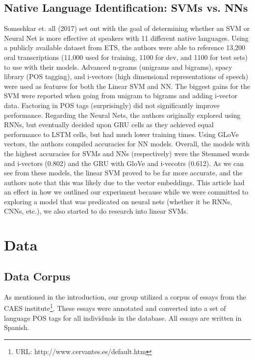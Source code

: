 \documentclass[12pt]{article}
\newcommand\tab[1][1cm]{\hspace*{#1}}
\begin{document}
 \subsection{Native Language Identification: SVMs vs. NNs}
 \tab Somsehkar et. all (2017) set out with the goal of determining whether an SVM or Neural Net is more effective at speakers with 11 different native languages. Using a publicly available dataset from ETS, the authors were able to reference 13,200 oral transcriptions (11,000 used for training, 1100 for dev, and 1100 for test sets) to use with their models. Advanced n-grams (unigrams and bigrams), spacy library (POS tagging), and i-vectors (high dimensional representations of speech) were used as features for both the Linear SVM and NN. The biggest gains for the SVM were reported when going from unigram to bigrams and adding i-vector data. Factoring in POS tags (surprisingly) did not significantly improve performance. Regarding the Neural Nets, the authors originally explored using RNNs, but eventually decided upon GRU cells as they achieved equal performance to LSTM cells, but had much lower training times. Using GLoVe vectors, the authors compiled accuracies for NN models. Overall, the models with the highest accuracies for SVMs and NNs (respectively) were the Stemmed words and i-vectors (0.802) and the GRU with GloVe and i-vecotrs (0.612). As we can see from these models, the linear SVM proved to be far more accurate, and the authors note that this was likely due to the vector embeddings. This article had an effect in how we outlined our experiment because while we were committed to exploring a model that was predicated on neural nets (whether it be RNNs, CNNs, etc.), we also started to do research into linear SVMs. 
 \section{Data}
 \subsection{Data Corpus}
 \tab As mentioned in the introduction, our group utilized a corpus of essays from the CAES institute\footnote{URL: http://www.cervantes.es/default.htm}. These essays were annotated and converted into a set of language POS tags for all individuals in the database. All essays are written in Spanish. 
\end{document}
